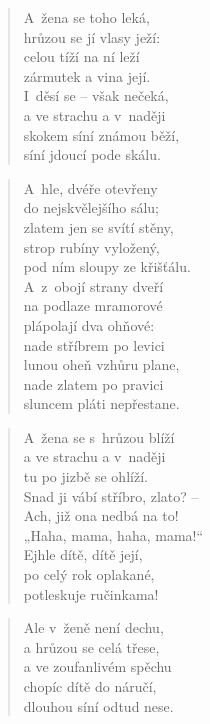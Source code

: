 \begin{verse}
A~žena se toho leká, \\
hrůzou se jí vlasy ježí: \\
celou tíží na ní leží \\
zármutek a vina její. \\
I~děsí se -- však nečeká, \\
a ve strachu a v~naději \\
skokem síní známou běží, \\
síní jdoucí pode skálu.
\end{verse}

\begin{verse}
A~hle, dvéře otevřeny \\
do nejskvělejšího sálu; \\
zlatem jen se svítí stěny, \\
strop rubíny vyložený, \\
pod ním sloupy ze křišťálu. \\
A~z~obojí strany dveří \\
na podlaze mramorové \\
plápolají dva ohňové: \\
nade stříbrem po levici \\
lunou oheň vzhůru plane, \\
nade zlatem po pravici \\
sluncem pláti nepřestane.
\end{verse}

\begin{verse}
A~žena se s~hrůzou blíží \\
a ve strachu a v~naději \\
tu po jizbě se ohlíží. \\
Snad ji vábí stříbro, zlato? -- \\
Ach, již ona nedbá na to! \\
„Haha, mama, haha, mama!“ \\
Ejhle dítě, dítě její, \\
po celý rok oplakané, \\
potleskuje ručinkama!
\end{verse}

\begin{verse}
Ale v~ženě není dechu, \\
a hrůzou se celá třese, \\
a ve zoufanlivém spěchu \\
chopíc dítě do náručí, \\
dlouhou síní odtud nese.
\end{verse}

